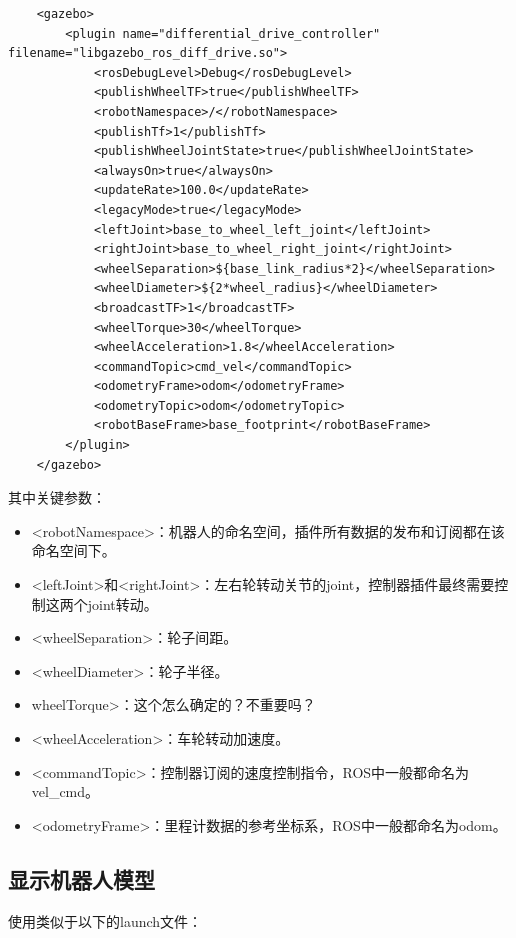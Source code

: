 \documentclass[9pt, oneside]{book}
\begin{document}
\begin{verbatim}
    <gazebo>
        <plugin name="differential_drive_controller" filename="libgazebo_ros_diff_drive.so">
            <rosDebugLevel>Debug</rosDebugLevel>
            <publishWheelTF>true</publishWheelTF>
            <robotNamespace>/</robotNamespace>
            <publishTf>1</publishTf>
            <publishWheelJointState>true</publishWheelJointState>
            <alwaysOn>true</alwaysOn>
            <updateRate>100.0</updateRate>
            <legacyMode>true</legacyMode>
            <leftJoint>base_to_wheel_left_joint</leftJoint>
            <rightJoint>base_to_wheel_right_joint</rightJoint>
            <wheelSeparation>${base_link_radius*2}</wheelSeparation>
            <wheelDiameter>${2*wheel_radius}</wheelDiameter>
            <broadcastTF>1</broadcastTF>
            <wheelTorque>30</wheelTorque>
            <wheelAcceleration>1.8</wheelAcceleration>
            <commandTopic>cmd_vel</commandTopic>
            <odometryFrame>odom</odometryFrame> 
            <odometryTopic>odom</odometryTopic> 
            <robotBaseFrame>base_footprint</robotBaseFrame>
        </plugin>
    </gazebo> 
\end{verbatim}

其中关键参数：
\begin{itemize}
    \item <robotNamespace>：机器人的命名空间，插件所有数据的发布和订阅都在该命名空间下。
    \item <leftJoint>和<rightJoint>：左右轮转动关节的joint，控制器插件最终需要控制这两个joint转动。
    \item <wheelSeparation>：轮子间距。
    \item <wheelDiameter>：轮子半径。
    \item \textcolor[rgb]{1,0,0}{wheelTorque>：这个怎么确定的？不重要吗？} 
    \item <wheelAcceleration>：车轮转动加速度。
    \item <commandTopic>：控制器订阅的速度控制指令，ROS中一般都命名为vel\_cmd。
    \item <odometryFrame>：里程计数据的参考坐标系，ROS中一般都命名为odom。
\end{itemize}

\subsection{显示机器人模型}

使用类似于以下的launch文件：
\end{document}
